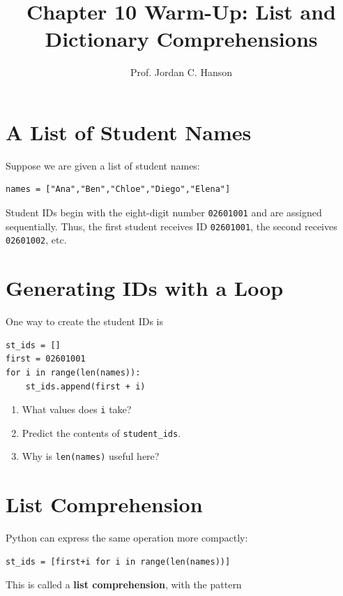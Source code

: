 \documentclass{article}
\begin{document}
\twocolumn

\title{Chapter 10 Warm-Up: List and Dictionary Comprehensions}
\author{Prof. Jordan C. Hanson}
\date{}

\maketitle

\section{A List of Student Names}

Suppose we are given a list of student names:

\begin{verbatim}
names = ["Ana","Ben","Chloe","Diego","Elena"]
\end{verbatim}
\noindent
Student IDs begin with the eight-digit number \texttt{02601001} and are assigned sequentially.  Thus, the first student receives ID \texttt{02601001}, the second receives \texttt{02601002}, etc.

\section{Generating IDs with a Loop}

One way to create the student IDs is

\begin{verbatim}
st_ids = []
first = 02601001
for i in range(len(names)):
    st_ids.append(first + i)
\end{verbatim}

\begin{enumerate}
\item What values does \texttt{i} take?
\item Predict the contents of \texttt{student\_ids}.
\item Why is \texttt{len(names)} useful here?
\end{enumerate}

\section{List Comprehension}

Python can express the same operation more compactly:

\begin{verbatim}
st_ids = [first+i for i in range(len(names))]
\end{verbatim}
\noindent
This is called a \textbf{list comprehension}, with the pattern
\end{document}
